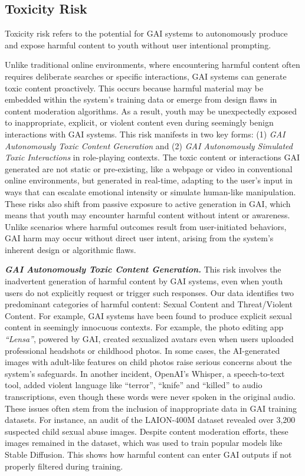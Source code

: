 \subsection{Toxicity Risk}
\begin{boxH}
Toxicity risk refers to the potential for GAI systems to autonomously produce and expose harmful content to youth without user intentional prompting.
\end{boxH}
Unlike traditional online environments, where encountering harmful content often requires deliberate searches or specific interactions, GAI systems can generate toxic content proactively. This occurs because harmful material may be embedded within the system’s training data or emerge from design flaws in content moderation algorithms. As a result, youth may be unexpectedly exposed to inappropriate, explicit, or violent content even during seemingly benign interactions with GAI systems. This risk manifests in two key forms: (1) \textit{GAI Autonomously Toxic Content Generation} and (2) \textit{GAI Autonomously Simulated Toxic Interactions} in role-playing contexts. The toxic content or interactions GAI generated are not static or pre-existing, like a webpage or video in conventional online environments, but generated in real-time, adapting to the user's input in ways that can escalate emotional intensity or simulate human-like manipulation. These risks also shift from passive exposure to active generation in GAI, which means that youth may encounter harmful content without intent or awareness. Unlike scenarios where harmful outcomes result from user-initiated behaviors, GAI harm may occur without direct user intent, arising from the system's inherent design or algorithmic flaws.

\textbf{\textit{GAI Autonomously Toxic Content Generation.}}
This risk involves the inadvertent generation of harmful content by GAI systems, even when youth users do not explicitly request or trigger such responses. Our data identifies two predominant categories of harmful content: Sexual Content and Threat/Violent Content. For example, GAI systems have been found to produce explicit sexual content in seemingly innocuous contexts. For example, the photo editing app \textit{``Lensa''}, powered by GAI, created sexualized avatars even when users uploaded professional headshots or childhood photos. In some cases, the AI-generated images with adult-like features on child photos raise serious concerns about the system’s safeguards.
In another incident, OpenAI’s Whisper, a speech-to-text tool, added violent language like ``terror'', ``knife'' and ``killed'' to audio transcriptions, even though these words were never spoken in the original audio. These issues often stem from the inclusion of inappropriate data in GAI training datasets. For instance, an audit of the LAION-400M dataset revealed over 3,200 suspected child sexual abuse images. Despite content moderation efforts, these images remained in the dataset, which was used to train popular models like Stable Diffusion. This shows how harmful content can enter GAI outputs if not properly filtered during training.


